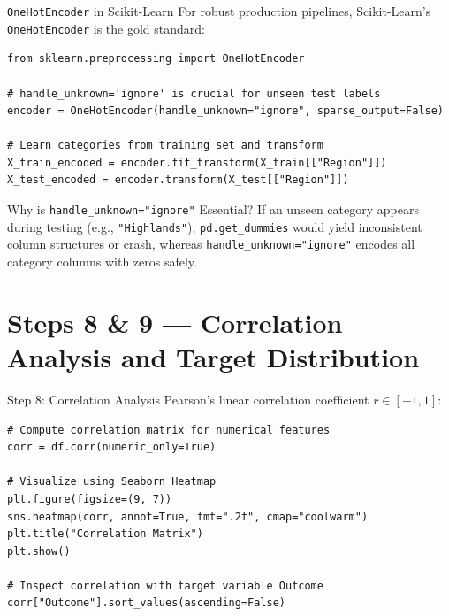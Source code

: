 \documentclass[aspectratio=169,11pt]{beamer}
\newcommand{\code}[1]{\texttt{#1}}
\newcommand{\smallgap}{\vspace{0.35em}}
\begin{document}
\begin{frame}[fragile]{\texttt{OneHotEncoder} in Scikit-Learn}
For robust production pipelines, Scikit-Learn's \code{OneHotEncoder} is the gold standard:

\begin{lstlisting}[style=pythonstyle]
from sklearn.preprocessing import OneHotEncoder

# handle_unknown='ignore' is crucial for unseen test labels
encoder = OneHotEncoder(handle_unknown="ignore", sparse_output=False)

# Learn categories from training set and transform
X_train_encoded = encoder.fit_transform(X_train[["Region"]])
X_test_encoded = encoder.transform(X_test[["Region"]])
\end{lstlisting}

\smallgap
\begin{block}{Why is \texttt{handle\_unknown="ignore"} Essential?}
If an unseen category appears during testing (e.g., \code{"Highlands"}), \code{pd.get\_dummies} would yield inconsistent column structures or crash, whereas \code{handle\_unknown="ignore"} encodes all category columns with zeros safely.
\end{block}
\end{frame}

\section{Steps 8 \& 9 — Correlation Analysis and Target Distribution}

\begin{frame}[fragile]{Step 8: Correlation Analysis}
Pearson's linear correlation coefficient $r \in [-1, 1]$:
\begin{lstlisting}[style=pythonstyle]
# Compute correlation matrix for numerical features
corr = df.corr(numeric_only=True)

# Visualize using Seaborn Heatmap
plt.figure(figsize=(9, 7))
sns.heatmap(corr, annot=True, fmt=".2f", cmap="coolwarm")
plt.title("Correlation Matrix")
plt.show()

# Inspect correlation with target variable Outcome
corr["Outcome"].sort_values(ascending=False)
\end{lstlisting}
\end{frame}
\end{document}

